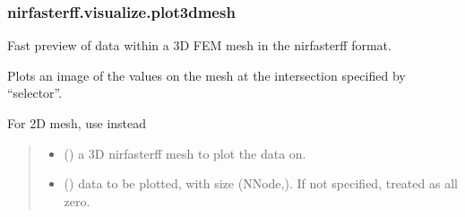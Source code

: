\documentclass[letterpaper,10pt,english]{sphinxmanual}
\begin{document}
\sphinxstepscope


\subsubsection{nirfasterff.visualize.plot3dmesh}
\label{\detokenize{_autosummary/nirfasterff.visualize.plot3dmesh:nirfasterff-visualize-plot3dmesh}}\label{\detokenize{_autosummary/nirfasterff.visualize.plot3dmesh::doc}}

\begin{fulllineitems}
\label{\detokenize{_autosummary/nirfasterff.visualize.plot3dmesh:nirfasterff.visualize.plot3dmesh}}
\pysigstartsignatures
\pysiglinewithargsret
{}
{\sphinxparamcomma {}\sphinxparamcomma {}\sphinxparamcomma {}}
{}
\pysigstopsignatures
\sphinxAtStartPar
Fast preview of data within a 3D FEM mesh in the nirfasterff format.

\sphinxAtStartPar
Plots an image of the values on the mesh at the intersection specified by “selector”.

\sphinxAtStartPar
For 2D mesh, use {\hyperref[\detokenize{_autosummary/nirfasterff.visualize.plotimage:nirfasterff.visualize.plotimage}]{}} instead
\begin{quote}\begin{description}
\begin{itemize}
\item {} 
\sphinxAtStartPar
{} () \textendash{} a 3D nirfasterff mesh to plot the data on.

\item {} 
\sphinxAtStartPar
{} (\sphinxstyleliteralemphasis{\sphinxupquote{, }}) \textendash{} data to be plotted, with size (NNode,). If not specified, treated as all zero.


\end{itemize}
\end{description}
\end{quote}
\end{fulllineitems}
\end{document}
